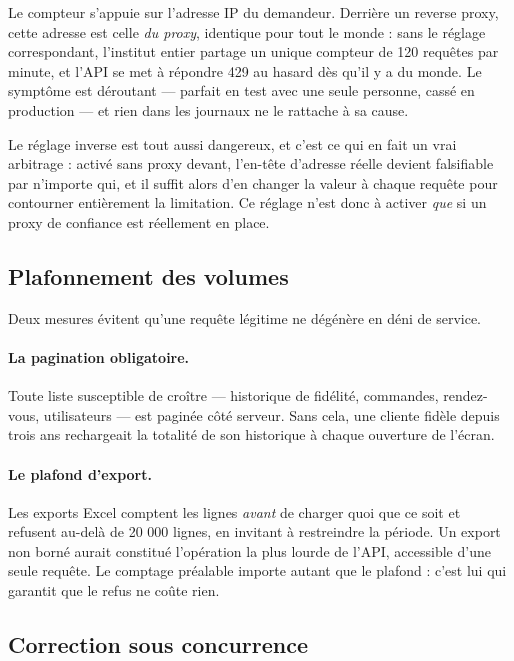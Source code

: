 \begin{attention}
Le compteur s'appuie sur l'adresse IP du demandeur. Derrière un reverse proxy,
cette adresse est celle \emph{du proxy}, identique pour tout le monde : sans le
réglage correspondant, l'institut entier partage un unique compteur de 120
requêtes par minute, et l'API se met à répondre 429 au hasard dès qu'il y a du
monde. Le symptôme est déroutant --- parfait en test avec une seule personne,
cassé en production --- et rien dans les journaux ne le rattache à sa cause.

Le réglage inverse est tout aussi dangereux, et c'est ce qui en fait un vrai
arbitrage : activé sans proxy devant, l'en-tête d'adresse réelle devient
falsifiable par n'importe qui, et il suffit alors d'en changer la valeur à
chaque requête pour contourner entièrement la limitation. Ce réglage n'est donc
à activer \emph{que} si un proxy de confiance est réellement en place.
\end{attention}

\subsection{Plafonnement des volumes}

Deux mesures évitent qu'une requête légitime ne dégénère en déni de service.

\paragraph{La pagination obligatoire.} Toute liste susceptible de croître ---
historique de fidélité, commandes, rendez-vous, utilisateurs --- est paginée
côté serveur. Sans cela, une cliente fidèle depuis trois ans rechargeait la
totalité de son historique à chaque ouverture de l'écran.

\paragraph{Le plafond d'export.} Les exports Excel comptent les lignes
\emph{avant} de charger quoi que ce soit et refusent au-delà de 20 000 lignes,
en invitant à restreindre la période. Un export non borné aurait constitué
l'opération la plus lourde de l'API, accessible d'une seule requête. Le
comptage préalable importe autant que le plafond : c'est lui qui garantit que
le refus ne coûte rien.

\subsection{Correction sous concurrence}

